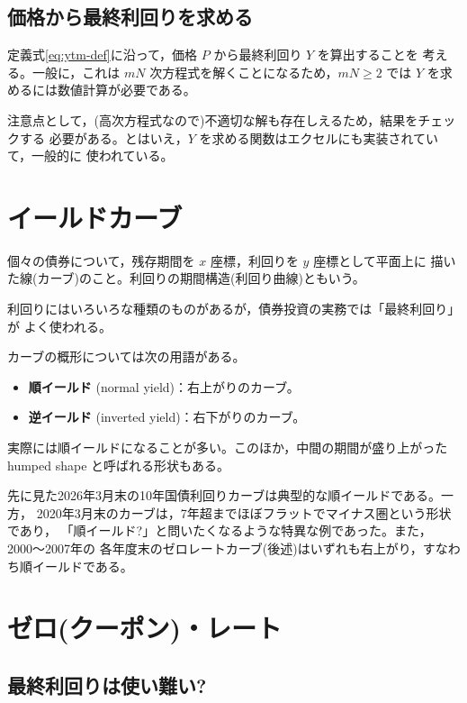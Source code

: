 \subsection{価格から最終利回りを求める}

定義式\eqref{eq:ytm-def}に沿って，価格 $P$ から最終利回り $Y$ を算出することを
考える。一般に，これは $mN$ 次方程式を解くことになるため，$mN \geq 2$ では
$Y$ を求めるには数値計算が必要である。

注意点として，(高次方程式なので)不適切な解も存在しえるため，結果をチェックする
必要がある。とはいえ，$Y$ を求める関数はエクセルにも実装されていて，一般的に
使われている。

\section{イールドカーブ}

\begin{definition}
個々の債券について，残存期間を $x$ 座標，利回りを $y$ 座標として平面上に
描いた線(カーブ)のこと。利回りの期間構造(利回り曲線)ともいう。
\end{definition}

利回りにはいろいろな種類のものがあるが，債券投資の実務では「最終利回り」が
よく使われる。

カーブの概形については次の用語がある。
\begin{itemize}
\item \textbf{順イールド} (normal yield)：右上がりのカーブ。
\item \textbf{逆イールド} (inverted yield)：右下がりのカーブ。
\end{itemize}
実際には順イールドになることが多い。このほか，中間の期間が盛り上がった
humped shape と呼ばれる形状もある。

先に見た2026年3月末の10年国債利回りカーブは典型的な順イールドである。一方，
2020年3月末のカーブは，7年超までほぼフラットでマイナス圏という形状であり，
「順イールド?」と問いたくなるような特異な例であった。また，2000〜2007年の
各年度末のゼロレートカーブ(後述)はいずれも右上がり，すなわち順イールドである。

\section{ゼロ(クーポン)・レート}

\subsection{最終利回りは使い難い?}

